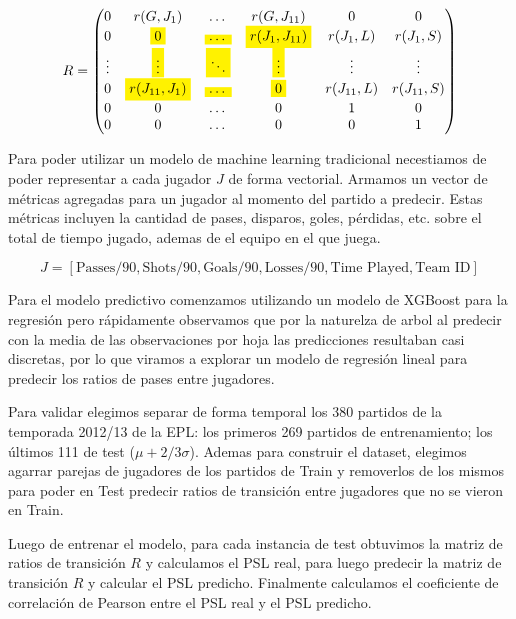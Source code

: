 \documentclass[
  a4paper,
]{article}
\begin{document}
\[
    R = \begin{pmatrix}
        0 & r(G, J_1) & \dots & r(G, J_{11}) & 0 & 0 \\
        0 &  \colorbox{yellow}{$0$} & \colorbox{yellow}{$\dots$} & \colorbox{yellow}{$r(J_1, J_{11})$} & r(J_1, L) & r(J_1, S) \\
        \vdots & \colorbox{yellow}{$\vdots$} & \colorbox{yellow}{$\ddots$} & \colorbox{yellow}{$\vdots$} & \vdots & \vdots \\
        0 & \colorbox{yellow}{$r(J_{11}, J_1)$} & \colorbox{yellow}{$\dots$} & \colorbox{yellow}{$0$} & r(J_{11}, L) & r(J_{11}, S) \\
        0 & 0 & \dots & 0 & 1 & 0 \\
        0 & 0 & \dots & 0 & 0 & 1 \\
    \end{pmatrix}
\]

Para poder utilizar un modelo de machine learning tradicional
necestiamos de poder representar a cada jugador \(J\) de forma
vectorial. Armamos un vector de métricas agregadas para un jugador al
momento del partido a predecir. Estas métricas incluyen la cantidad de
pases, disparos, goles, pérdidas, etc. sobre el total de tiempo jugado,
ademas de el equipo en el que juega.

\[
    J = [\text{Passes/90}, \text{Shots/90}, \text{Goals/90}, \text{Losses/90}, \text{Time Played}, \text{Team ID}]
\]

Para el modelo predictivo comenzamos utilizando un modelo de XGBoost
para la regresión pero rápidamente observamos que por la naturelza de
arbol al predecir con la media de las observaciones por hoja las
predicciones resultaban casi discretas, por lo que viramos a explorar un
modelo de regresión lineal para predecir los ratios de pases entre
jugadores.

Para validar elegimos separar de forma temporal los 380 partidos de la
temporada 2012/13 de la EPL: los primeros 269 partidos de entrenamiento;
los últimos 111 de test (\(\mu + 2/3 \sigma\)). Ademas para construir el
dataset, elegimos agarrar parejas de jugadores de los partidos de Train
y removerlos de los mismos para poder en Test predecir ratios de
transición entre jugadores que no se vieron en Train.

Luego de entrenar el modelo, para cada instancia de test obtuvimos la
matriz de ratios de transición \(R\) y calculamos el PSL real, para
luego predecir la matriz de transición \(\hat{R}\) y calcular el PSL
predicho. Finalmente calculamos el coeficiente de correlación de Pearson
entre el PSL real y el PSL predicho.
\end{document}

